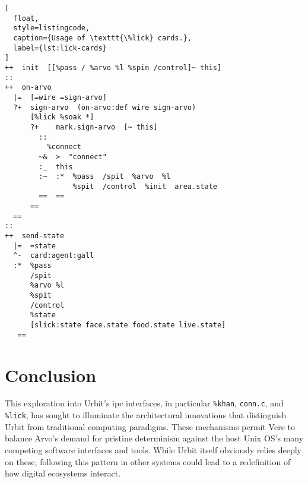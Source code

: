 \documentclass[twoside]{article}
\begin{document}
\begin{lstlisting}[
  float,
  style=listingcode,
  caption={Usage of \texttt{\%lick} cards.},
  label={lst:lick-cards}
]
++  init  [[%pass / %arvo %l %spin /control]~ this]
::
++  on-arvo
  |=  [=wire =sign-arvo]
  ?+  sign-arvo  (on-arvo:def wire sign-arvo)
      [%lick %soak *]
      ?+    mark.sign-arvo  [~ this]
        ::
          %connect
        ~&  >  "connect"
        :_  this
        :~  :*  %pass  /spit  %arvo  %l
                %spit  /control  %init  area.state
        ==  ==
      ==
  ==
::
++  send-state
  |=  =state
  ^-  card:agent:gall
  :*  %pass 
      /spit 
      %arvo %l 
      %spit 
      /control 
      %state 
      [slick:state face.state food.state live.state]
   ==
\end{lstlisting}


\section{Conclusion}

This exploration into Urbit's {\sc ipc} interfaces, in particular \texttt{\%khan}, \texttt{conn.c}, and \texttt{\%lick}, has sought to illuminate the architectural innovations that distinguish Urbit from traditional computing paradigms.  These mechanisms permit Vere to balance Arvo's demand for pristine determinism against the host Unix OS's many competing software interfaces and tools.  While Urbit itself obviously relies deeply on these, following this pattern in other systems could lead to a redefinition of how digital ecosystems interact. \tombstone{}

\printbibliography
\end{document}
